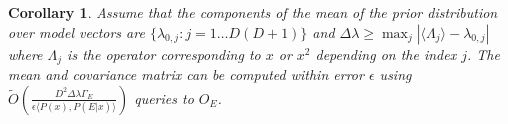 \documentclass[aps,amsmath,onecolumn,amssymb]{revtex4}
\newtheorem{corollary}{Corollary}
\begin{document}


\begin{corollary}
Assume that the components of the mean of the prior distribution over model vectors are $\{\lambda_{0,j}:j=1\ldots D(D+1)\}$ and $\Delta \lambda \ge \max_j |\langle \Lambda_j \rangle-\lambda_{0,j}|$ where $\Lambda_j$ is the operator corresponding to $x$ or $x^2$  depending on the index $j$.  The mean and covariance matrix can be computed within error $\epsilon$ using $\tilde{O}\left(\frac{D^2\Delta \lambda \Gamma_E}{\epsilon \langle P(x), P(E|x)\rangle}\right)$ queries to $O_E$.\label{cor:method}
\end{corollary}
\end{document}
